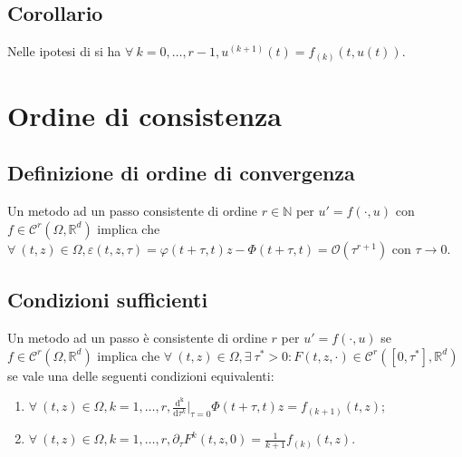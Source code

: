 \documentclass[hidelinks, 10pt]{report}
\begin{document}
\subsection{Corollario}
Nelle ipotesi di  si ha $ \forall\ k = 0, \dotsc, r - 1, u^{(k + 1)} (t) = f_{(k)} (t, u(t)) $.

\section{Ordine di consistenza}
\subsection{Definizione di ordine di convergenza}
Un metodo ad un passo consistente di ordine $ r \in \mathbb{N} $ per $ u' = f(\cdot, u) $ con $ f \in \mathcal{C}^{r} (\Omega, \mathbb{R}^{d}) $ implica che $ \forall\ (t, z) \in \Omega, \varepsilon(t, z, \tau) = \varphi (t + \tau, t)z - \Phi(t + \tau, t) = \mathcal{O}(\tau^{r + 1}) $ con $ \tau \to 0 $.

\subsection{Condizioni sufficienti}	\label{section:12.2}
Un metodo ad un passo \`e consistente di ordine $ r $ per $ u' = f(\cdot, u) $ se $ f \in \mathcal{C}^{r}(\Omega, \mathbb{R}^{d}) $ implica che $ \forall\ (t, z) \in \Omega, \exists\ \tau^{\ast} > 0 : F(t, z, \cdot) \in \mathcal{C}^{r}([0, \tau^{\ast}], \mathbb{R}^{d}) $ se vale una delle seguenti condizioni equivalenti:
\begin{enumerate}
\item $ \forall\ (t, z) \in \Omega, k = 1, \dotsc, r, \frac{\mathrm{d^{k}}}{\mathrm{d} \tau^{k}} \big\vert_{\tau = 0} \Phi(t + \tau, t)z = f_{(k + 1)}(t, z) $;
\item $ \forall\ (t, z) \in \Omega, k = 1, \dotsc, r, \partial_{\tau} F^{k} (t, z, 0) = \frac{1}{k + 1} f_{(k)} (t, z) $.
\end{enumerate}
\end{document}
